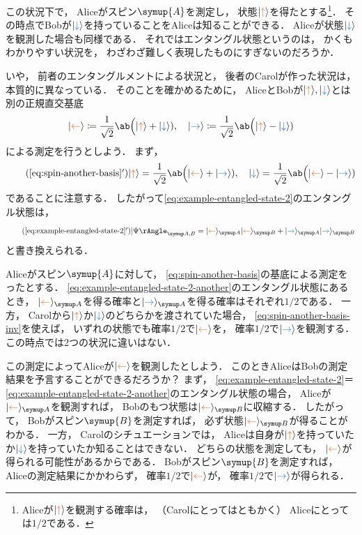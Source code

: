 \documentclass[
]{sotsu}
\newcommand{\bitone}{\mathcolor{fire}{\uparrow}}
\newcommand{\bittwo}{\mathcolor{water}{\downarrow}}
\newcommand{\bitthr}{\mathcolor{fire}{\leftarrow}}
\newcommand{\bitfou}{\mathcolor{water}{\rightarrow}}
\begin{document}
この状況下で，
Aliceがスピン$\symup{A}$を測定し，
状態$\ket{\bitone}$を得たとする\footnote{
    Aliceが$\ket{\bitone}$を観測する確率は，
    （Carolにとってはともかく）
    Aliceにとっては$1/2$である．
}．
その時点でBobが$\ket{\bittwo}$を持っていることをAliceは知ることができる．
Aliceが状態$\ket{\bittwo}$を観測した場合も同様である．
それではエンタングル状態というのは，
かくもわかりやすい状況を，
わざわざ難しく表現したものにすぎないのだろうか．

いや，
前者のエンタングルメントによる状況と，
後者のCarolが作った状況は，
本質的に異なっている．
そのことを確かめるために，
AliceとBobが$\ket{\bitone}, \ket{\bittwo}$とは別の正規直交基底
\begin{align}
    \label{eq:spin-another-basis}
    \ket{\bitthr} 
    \coloneq \frac{1}{\sqrt{2}} \ab\Big( \ket{\bitone} + \ket{\bittwo} )
    ,
    \quad 
    \ket{\bitfou} 
    \coloneq \frac{1}{\sqrt{2}} \ab\Big( \ket{\bitone} - \ket{\bittwo} )
\end{align}
による測定を行うとしよう．
まず，
\begin{equation}
    \label{eq:spin-another-basis-inv}
    \tag{\ref*{eq:spin-another-basis}$'$}
    \ket{\bitone} = \frac{1}{\sqrt{2}} \ab\Big( \ket{\bitthr} + \ket{\bitfou} ),
    \quad 
    \ket{\bittwo} = \frac{1}{\sqrt{2}} \ab\Big( \ket{\bitthr} - \ket{\bitfou} )
\end{equation}
であることに注意する．
したがって\cref{eq:example-entangled-state-2}のエンタングル状態は，
\begin{equation}
    \label{eq:example-entangled-state-2-another}
    \tag{\ref*{eq:example-entangled-state-2}$'$}
    \Ket{\Psi}<A,B> = \ket{\bitthr}<A> \ket{\bitthr}<B> + \ket{\bitfou}<A> \ket{\bitfou}<B>
\end{equation}
と書き換えられる．

Aliceがスピン$\symup{A}$に対して，
\cref{eq:spin-another-basis}の基底による測定をったとする．
\cref{eq:example-entangled-state-2-another}のエンタングル状態にあるとき，
$\ket{\bitthr}<A>$を得る確率と$\ket{\bitfou}<A>$を得る確率はそれぞれ$1/2$である．
一方，
Carolから$\ket{\bitone}$か$\ket{\bittwo}$のどちらかを渡されていた場合，
\cref{eq:spin-another-basis-inv}を使えば，
いずれの状態でも確率$1/2$で$\ket{\bitthr}$を，
確率$1/2$で$\ket{\bitfou}$を観測する．
この時点では2つの状況に違いはない．

この測定によってAliceが$\ket{\bitthr}$を観測したとしよう．
このときAliceはBobの測定結果を予言することができるだろうか？\quad 
まず，
\cref{eq:example-entangled-state-2}＝\cref{eq:example-entangled-state-2-another}のエンタングル状態の場合，
Aliceが$\ket{\bitthr}<A>$を観測すれば，
Bobのもつ状態は$\ket{\bitthr}<B>$に収縮する．
したがって，
Bobがスピン$\symup{B}$を測定すれば，
必ず状態$\ket{\bitthr}<B>$が得ることがわかる．
一方，
Carolのシチュエーションでは，
Aliceは自身が$\ket{\bitone}$を持っていたか$\ket{\bittwo}$を持っていたか知ることはできない．
どちらの状態を測定しても，
$\ket{\bitthr}$が得られる可能性があるからである．
Bobがスピン$\symup{B}$を測定すれば，
Aliceの測定結果にかかわらず，
確率$1/2$で$\ket{\bitthr}$が，
確率$1/2$で$\ket{\bitfou}$が得られる．
\end{document}
